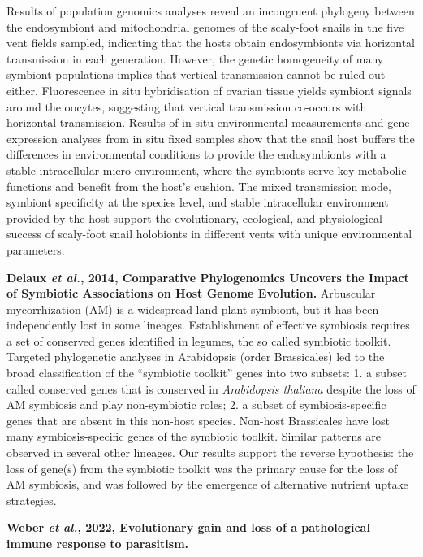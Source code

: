 \documentclass[11pt]{article}
\begin{document}
\begin{sloppypar}
Results of population genomics analyses reveal an incongruent phylogeny between the endosymbiont and mitochondrial genomes of the scaly-foot snails in the five vent fields sampled, indicating that the hosts obtain endosymbionts via horizontal transmission in each generation. 
However, the genetic homogeneity of many symbiont populations implies that vertical transmission cannot be ruled out either. 
Fluorescence in situ hybridisation of ovarian tissue yields symbiont signals around the oocytes, suggesting that vertical transmission co-occurs with horizontal transmission. 
Results of in situ environmental measurements and gene expression analyses from in situ fixed samples show that the snail host buffers the differences in environmental conditions to provide the endosymbionts with a stable intracellular micro-environment, where the symbionts serve key metabolic functions and benefit from the host's cushion. 
The mixed transmission mode, symbiont specificity at the species level, and stable intracellular environment provided by the host support the evolutionary, ecological, and physiological success of scaly-foot snail holobionts in different vents with unique environmental parameters.
\par
\textbf{Delaux \textit{et al.}, 2014, Comparative Phylogenomics Uncovers the Impact of Symbiotic Associations on Host Genome Evolution.} \newline
Arbuscular mycorrhization (AM) is a widespread land plant symbiont, but it has been independently lost in some lineages. 
Establishment of effective symbiosis requires a set of conserved genes identified in legumes, the so called symbiotic toolkit. 
Targeted phylogenetic analyses in Arabidopsis (order Brassicales) led to the broad classification of the “symbiotic toolkit” genes into two subsets: 
1. a subset called conserved genes that is conserved in \textit{Arabidopsis thaliana} despite the loss of AM symbiosis and play non-symbiotic roles; 
2. a subset of symbiosis-specific genes that are absent in this non-host species. 
Non-host Brassicales have lost many symbiosis-specific genes of the symbiotic toolkit. 
Similar patterns are observed in several other lineages. 
Our results support the reverse hypothesis: the loss of gene(s) from the symbiotic toolkit was the primary cause for the loss of AM symbiosis, and was followed by the emergence of alternative nutrient uptake strategies. 
\par
\textbf{Weber \textit{et al.}, 2022, Evolutionary gain and loss of a pathological immune response to parasitism.}
\par

\end{sloppypar}
\end{document}
